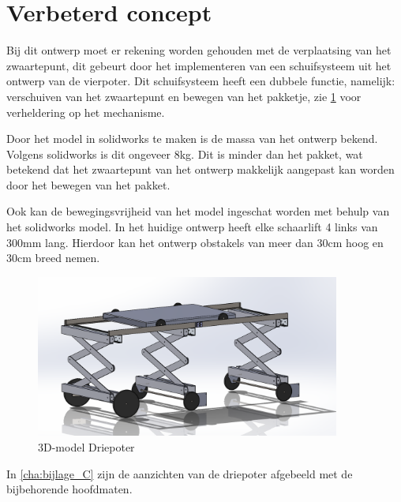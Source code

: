 \section{Verbeterd concept}
\label{se:Verbeterd_concept} 
Bij dit ontwerp moet er rekening worden gehouden met de verplaatsing van het zwaartepunt, dit gebeurt door het implementeren van een schuifsysteem uit het ontwerp van de vierpoter. Dit schuifsysteem heeft een dubbele functie, namelijk: verschuiven van het zwaartepunt en bewegen van het pakketje, zie \cref{fig:driepoter_SW} voor verheldering op het mechanisme. 

Door het model in solidworks te maken is de massa van het ontwerp bekend. Volgens solidworks is dit ongeveer 8kg. Dit is minder dan het pakket, wat betekend dat het zwaartepunt van het ontwerp makkelijk aangepast kan worden door het bewegen van het pakket.

Ook kan de bewegingsvrijheid van het model ingeschat worden met behulp van het solidworks model. In het huidige ontwerp heeft elke schaarlift 4 links van 300mm lang. Hierdoor kan het ontwerp obstakels van meer dan 30cm hoog en 30cm breed nemen.

\begin{figure}[H]
    \centering
    \includegraphics[width = 100mm]{04_gekozenconcept/eindconcept.png}
    \caption{3D-model Driepoter}
    \label{fig:driepoter_SW}
\end{figure}

In \cref{cha:bijlage_C} zijn de aanzichten van de driepoter afgebeeld met de bijbehorende hoofdmaten. 
